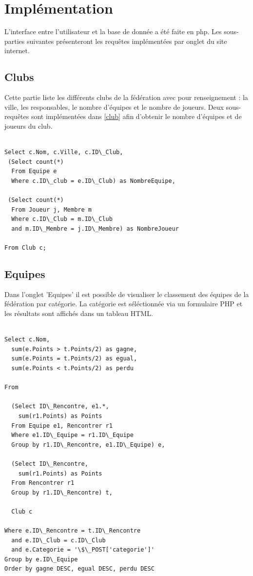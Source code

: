 \documentclass[a4paper»,8pt,french,fleqn]{report}
\begin{document}
\chapter{Implémentation}

L'interface entre l'utilisateur et la base de donnée a été faite en php. Les sous-parties suivantes présenteront les requêtes implémentées par onglet du site internet.

\section{Clubs}

Cette partie liste les différents clubs de la fédération avec pour renseignement : la ville, les responsables, le nombre d'équipes et le nombre de joueurs. Deux sous-requêtes sont implémentées dans \ref{club} afin d'obtenir le nombre d'équipes et de joueurs du club. 

\begin{lstlisting}

Select c.Nom, c.Ville, c.ID\_Club,
 (Select count(*) 
  From Equipe e
  Where c.ID\_club = e.ID\_Club) as NombreEquipe,

 (Select count(*) 
  From Joueur j, Membre m
  Where c.ID\_Club = m.ID\_Club
  and m.ID\_Membre = j.ID\_Membre) as NombreJoueur

From Club c;
\end{lstlisting}

\section{Equipes}

Dans l'onglet 'Equipes' il est possible de visualiser le classement des équipes de la fédération par catégorie. La catégorie est séléctionnée via un formulaire PHP et les résultats sont affichés dans un tableau HTML.

\begin{lstlisting}

Select c.Nom,
  sum(e.Points > t.Points/2) as gagne,
  sum(e.Points = t.Points/2) as egual,
  sum(e.Points < t.Points/2) as perdu
  
From
  
  (Select ID\_Rencontre, e1.*,
    sum(r1.Points) as Points
  From Equipe e1, Rencontrer r1
  Where e1.ID\_Equipe = r1.ID\_Equipe
  Group by r1.ID\_Rencontre, e1.ID\_Equipe) e,

  (Select ID\_Rencontre,
    sum(r1.Points) as Points
  From Rencontrer r1
  Group by r1.ID\_Rencontre) t,
  
  Club c

Where e.ID\_Rencontre = t.ID\_Rencontre
  and e.ID\_Club = c.ID\_Club
  and e.Categorie = '\$\_POST['categorie']'
Group by e.ID\_Equipe
Order by gagne DESC, egual DESC, perdu DESC

\end{lstlisting}
\end{document}
